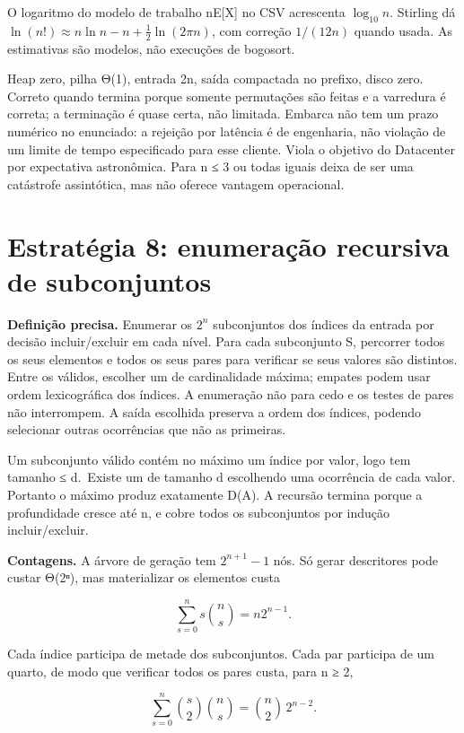 \documentclass[
  brazilian,
  11pt,
  a4paper,
]{article}
\let\oldsection\section
\renewcommand{\section}{\Needspace{6\baselineskip}\oldsection}
\begin{document}
O logaritmo do modelo de trabalho nE{[}X{]} no CSV acrescenta
\(\log_{10}n\). Stirling dá
\(\ln(n!)\approx n\ln n-n+\tfrac12\ln(2\pi n)\), com correção
\(1/(12n)\) quando usada. As estimativas são modelos, não execuções de
bogosort.

Heap zero, pilha Θ(1), entrada 2n, saída compactada no prefixo, disco
zero. Correto quando termina porque somente permutações são feitas e a
varredura é correta; a terminação é quase certa, não limitada. Embarca
não tem um prazo numérico no enunciado: a rejeição por latência é de
engenharia, não violação de um limite de tempo especificado para esse
cliente. Viola o objetivo do Datacenter por expectativa astronômica.
Para n ≤ 3 ou todas iguais deixa de ser uma catástrofe assintótica, mas
não oferece vantagem operacional.

\section{Estratégia 8: enumeração recursiva de
subconjuntos}\label{estratuxe9gia-8-enumerauxe7uxe3o-recursiva-de-subconjuntos}

\textbf{Definição precisa.} Enumerar os \(2^n\) subconjuntos dos índices
da entrada por decisão incluir/excluir em cada nível. Para cada
subconjunto S, percorrer todos os seus elementos e todos os seus pares
para verificar se seus valores são distintos. Entre os válidos, escolher
um de cardinalidade máxima; empates podem usar ordem lexicográfica dos
índices. A enumeração não para cedo e os testes de pares não
interrompem. A saída escolhida preserva a ordem dos índices, podendo
selecionar outras ocorrências que não as primeiras.

Um subconjunto válido contém no máximo um índice por valor, logo tem
tamanho ≤ d.~Existe um de tamanho d escolhendo uma ocorrência de cada
valor. Portanto o máximo produz exatamente D(A). A recursão termina
porque a profundidade cresce até n, e cobre todos os subconjuntos por
indução incluir/excluir.

\textbf{Contagens.} A árvore de geração tem \(2^{n+1}-1\) nós. Só gerar
descritores pode custar Θ(2ⁿ), mas materializar os elementos custa

\[\sum_{s=0}^n s\binom ns=n2^{n-1}.\]

Cada índice participa de metade dos subconjuntos. Cada par participa de
um quarto, de modo que verificar todos os pares custa, para n ≥ 2,

\[\sum_{s=0}^n\binom s2\binom ns=\binom n2\,2^{n-2}.\]
\end{document}
